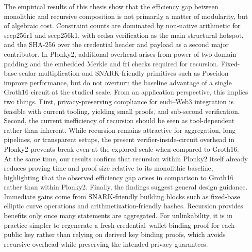 \medskip
The empirical results of this thesis show that the efficiency gap between monolithic and recursive composition is not primarily a matter of modularity, but of algebraic cost. Constraint counts are dominated by non-native arithmetic for secp256r1 and secp256k1, with \acrshort{ecdsa} verification as the main structural hotspot, and the SHA-256 over the credential header and payload as a second major contributor. In Plonky2, additional overhead arises from power-of-two domain padding and the embedded Merkle and \acrshort{fri} checks required for recursion. Fixed-base scalar multiplication and SNARK-friendly primitives such as Poseidon improve performance, but do not overturn the baseline advantage of a single Groth16 circuit at the studied scale. From an application perspective, this implies two things. First, privacy-preserving compliance for \acrshort{eudi}–Web3 integration is feasible with current tooling, yielding small proofs, and sub-second verification. Second, the current inefficiency of recursion should be seen as tool-dependent rather than inherent. While recursion remains attractive for aggregation, long pipelines, or transparent setups, the present verifier-inside-circuit overhead in Plonky2 prevents break-even at the explored scale when compared to Groth16. At the same time, our results confirm that recursion within Plonky2 itself already reduces proving time and proof size relative to its monolithic baseline, highlighting that the observed efficiency gap arises in comparison to Groth16 rather than within Plonky2. Finally, the findings suggest general design guidance. Immediate gains come from SNARK-friendly building blocks such as fixed-base elliptic curve operations and arithmetization-friendly hashes. Recursion provides benefits only once many statements are aggregated. For unlinkability, it is in practice simpler to regenerate a fresh credential–wallet binding proof for each public key rather than relying on derived key binding proofs, which avoids recursive overhead while preserving the intended privacy guarantees.

